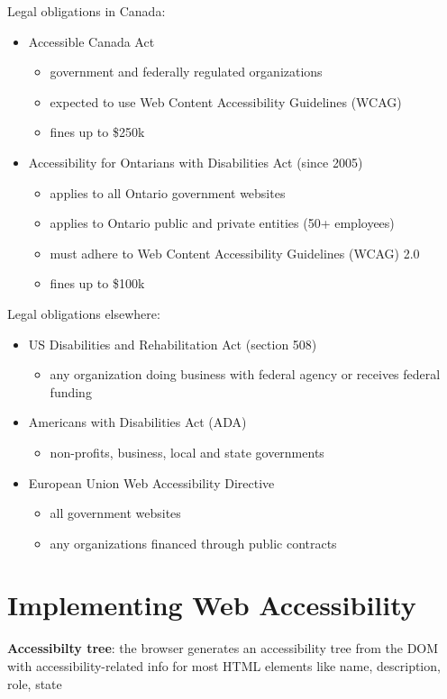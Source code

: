 \documentclass[11pt]{article}
\begin{document}
Legal obligations in Canada:
\begin{itemize}
\item Accessible Canada Act
\begin{itemize}
\item government and federally regulated organizations
\item expected to use Web Content Accessibility Guidelines (WCAG)
\item fines up to \$250k
\end{itemize}
\item Accessibility for Ontarians with Disabilities Act (since 2005)
\begin{itemize}
\item applies to all Ontario government websites
\item applies to Ontario public and private entities (50+ employees)
\item must adhere to Web Content Accessibility Guidelines (WCAG) 2.0
\item fines up to \$100k
\end{itemize}
\end{itemize}

Legal obligations elsewhere:
\begin{itemize}
\item US Disabilities and Rehabilitation Act (section 508)
\begin{itemize}
\item any organization doing business with federal agency or receives federal
funding
\end{itemize}
\item Americans with Disabilities Act (ADA)
\begin{itemize}
\item non-profits, business, local and state governments
\end{itemize}
\item European Union Web Accessibility Directive
\begin{itemize}
\item all government websites
\item any organizations financed through public contracts
\end{itemize}
\end{itemize}
\section{Implementing Web Accessibility}
\label{sec:org5c1c293}
\textbf{Accessibilty tree}: the browser generates an accessibility tree from the DOM with
accessibility-related info for most HTML elements like name, description, role, state
\end{document}
